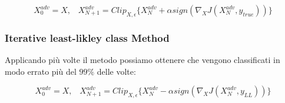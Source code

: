 \[
X_0^{adv} = X,  \;\;\; X_{N+1}^{adv} = Clip_{X, \epsilon}\{X_N^{adv} + \alpha sign(\nabla_XJ(X_{N}^{adv}, y_{true}))\}
\]

\subsubsection{Iterative least-likley class Method}
Applicando più volte il metodo  possiamo ottenere  che vengono classificati in modo errato più del \(99\%\) delle volte:

\[
X_0^{adv} = X, \;\;\; X_{N+1}^{adv} = Clip_{X, \epsilon}\{X_N^{adv} - \alpha sign(\nabla_XJ(X_N^{adv}, y_{LL}))\}
\]


